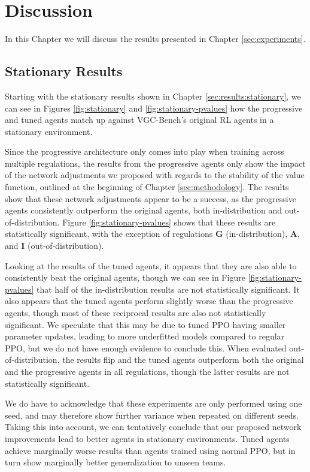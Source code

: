%
%
\chapter{Discussion} \label{sec:discussion}
In this Chapter we will discuss the results presented in Chapter \ref{sec:experiments}.

\section{Stationary Results} \label{sec:discussion:stationary}
Starting with the stationary results shown in Chapter \ref{sec:results:stationary}, we can see in Figures \ref{fig:stationary} and \ref{fig:stationary-pvalues} how the progressive and tuned agents match up against VGC-Bench's original RL agents in a stationary environment.

Since the progressive architecture only comes into play when training across multiple regulations, the results from the progressive agents only show the impact of the network adjustments we proposed with regards to the stability of the value function, outlined at the beginning of Chapter \ref{sec:methodology}.
The results show that these network adjustments appear to be a success, as the progressive agents consistently outperform the original agents, both in-distribution and out-of-distribution.
Figure \ref{fig:stationary-pvalues} shows that these results are statistically significant, with the exception of regulations \textbf{G} (in-distribution), \textbf{A}, and \textbf{I} (out-of-distribution).

Looking at the results of the tuned agents, it appears that they are also able to consistently beat the original agents, though we can see in Figure \ref{fig:stationary-pvalues} that half of the in-distribution results are not statistically significant.
It also appears that the tuned agents perform slightly worse than the progressive agents, though most of these reciprocal results are also not statistically significant.
We speculate that this may be due to tuned PPO having smaller parameter updates, leading to more underfitted models compared to regular PPO, but we do not have enough evidence to conclude this.
When evaluated out-of-distribution, the results flip and the tuned agents outperform both the original and the progressive agents in all regulations, though the latter results are not statistically significant.

We do have to acknowledge that these experiments are only performed using one seed, and may therefore show further variance when repeated on different seeds.
Taking this into account, we can tentatively conclude that our proposed network improvements lead to better agents in stationary environments.
Tuned agents achieve marginally worse results than agents trained using normal PPO, but in turn show marginally better generalization to unseen teams.

